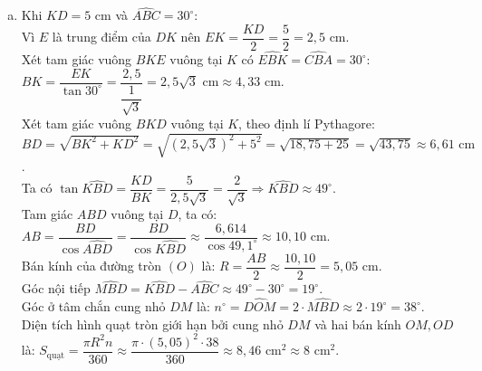 \begin{bt}
{\begin{enumerate}[a)]
    Tam giác $ABC$ vuông tại $A$ có đường cao $AM$, áp dụng hệ thức lượng ta có:
    $CA^2 = CM \cdot CB$.\\
    Chứng minh $E$ là trung điểm của $DK$:\\
    Ta có $DK \perp AB$ và $CA \perp AB$ (do tam giác $ABC$ vuông tại $A$) nên $DK \parallel CA$.\\
    Kéo dài $BD$ cắt đường thẳng $CA$ tại điểm $P$.\\
    Vì $\widehat{BAP} = 90^\circ$ và $AD \perp BP$ nên tam giác $BAP$ vuông tại $A$ có $AD$ là đường cao.\\
    Ta có $CA$ và $CD$ là hai tiếp tuyến của $(O)$ nên $CA = CD$.\\
    Lại có $\widehat{CPD} = 90^\circ - \widehat{PBA} = \widehat{DAB} = \widehat{CDA}$, do đó tam giác $CPD$ cân tại $C$, suy ra $CD = CP$.\\
    Từ đó ta có $CA = CP$, nghĩa là $C$ là trung điểm của đoạn thẳng $AP$.\\
    Trong tam giác $BAP$, vì $DK \parallel AP$, áp dụng hệ quả định lí Thales ta có:
    $\dfrac{EK}{CA} = \dfrac{BE}{BC} = \dfrac{ED}{CP}$.\\
    Vì $CA = CP$ nên $EK = ED$, suy ra $E$ là trung điểm của đoạn thẳng $DK$.
    \item Khi $KD = 5\text{ cm}$ và $\widehat{ABC} = 30^\circ$:\\
    Vì $E$ là trung điểm của $DK$ nên $EK = \dfrac{KD}{2} = \dfrac{5}{2} = 2{,}5\text{ cm}$.\\
    Xét tam giác vuông $BKE$ vuông tại $K$ có $\widehat{EBK} = \widehat{CBA} = 30^\circ$:\\
    $BK = \dfrac{EK}{\tan 30^\circ} = \dfrac{2{,}5}{\dfrac{1}{\sqrt{3}}} = 2{,}5\sqrt{3}\text{ cm} \approx 4{,}33\text{ cm}$.\\
    Xét tam giác vuông $BKD$ vuông tại $K$, theo định lí Pythagore:
    $BD = \sqrt{BK^2 + KD^2} = \sqrt{(2{,}5\sqrt{3})^2 + 5^2} = \sqrt{18{,}75 + 25} = \sqrt{43{,}75} \approx 6{,}61\text{ cm}$.\\
    Ta có $\tan \widehat{KBD} = \dfrac{KD}{BK} = \dfrac{5}{2{,}5\sqrt{3}} = \dfrac{2}{\sqrt{3}} \Rightarrow \widehat{KBD} \approx 49^\circ$.\\
    Tam giác $ABD$ vuông tại $D$, ta có:
    $AB = \dfrac{BD}{\cos \widehat{ABD}} = \dfrac{BD}{\cos \widehat{KBD}} \approx \dfrac{6{,}614}{\cos 49{,}1^\circ} \approx 10{,}10\text{ cm}$.\\
    Bán kính của đường tròn $(O)$ là:
    $R = \dfrac{AB}{2} \approx \dfrac{10{,}10}{2} = 5{,}05\text{ cm}$.\\
    Góc nội tiếp $\widehat{MBD} = \widehat{KBD} - \widehat{ABC} \approx 49^\circ - 30^\circ = 19^\circ$.\\
    Góc ở tâm chắn cung nhỏ $DM$ là:
    $n^\circ = \widehat{DOM} = 2 \cdot \widehat{MBD} \approx 2 \cdot 19^\circ = 38^\circ$.\\
    Diện tích hình quạt tròn giới hạn bởi cung nhỏ $DM$ và hai bán kính $OM, OD$ là:
    $S_{\text{quạt}} = \dfrac{\pi R^2 n}{360} \approx \dfrac{\pi \cdot (5{,}05)^2 \cdot 38}{360} \approx 8{,}46\text{ cm}^2 \approx 8\text{ cm}^2$.
\end{enumerate}
}
\end{bt}

